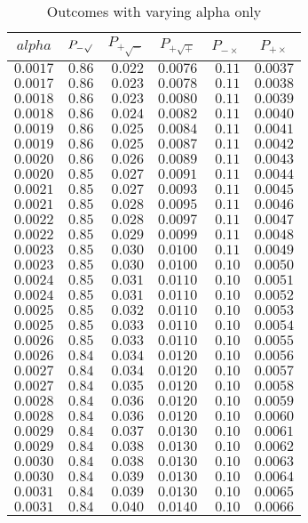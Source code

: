 %
\begin{table}[\hbtp]
 \small
 \begin{center}
 \begin{tabular}{rrrrrr}\hline\hline
\multicolumn{1}{c}{$alpha$}&\multicolumn{1}{c}{$P_{-\surd}$}&\multicolumn{1}{c}{$P_{+\surd - }$}&\multicolumn{1}{c}{$P_{+\surd +}$}&\multicolumn{1}{c}{$P_{-\times}$}&\multicolumn{1}{c}{$P_{+\times}$}\tabularnewline
\hline
$0.0017$&$0.86$&$0.022$&$0.0076$&$0.11$&$0.0037$\tabularnewline
$0.0017$&$0.86$&$0.023$&$0.0078$&$0.11$&$0.0038$\tabularnewline
$0.0018$&$0.86$&$0.023$&$0.0080$&$0.11$&$0.0039$\tabularnewline
$0.0018$&$0.86$&$0.024$&$0.0082$&$0.11$&$0.0040$\tabularnewline
$0.0019$&$0.86$&$0.025$&$0.0084$&$0.11$&$0.0041$\tabularnewline
$0.0019$&$0.86$&$0.025$&$0.0087$&$0.11$&$0.0042$\tabularnewline
$0.0020$&$0.86$&$0.026$&$0.0089$&$0.11$&$0.0043$\tabularnewline
$0.0020$&$0.85$&$0.027$&$0.0091$&$0.11$&$0.0044$\tabularnewline
$0.0021$&$0.85$&$0.027$&$0.0093$&$0.11$&$0.0045$\tabularnewline
$0.0021$&$0.85$&$0.028$&$0.0095$&$0.11$&$0.0046$\tabularnewline
$0.0022$&$0.85$&$0.028$&$0.0097$&$0.11$&$0.0047$\tabularnewline
$0.0022$&$0.85$&$0.029$&$0.0099$&$0.11$&$0.0048$\tabularnewline
$0.0023$&$0.85$&$0.030$&$0.0100$&$0.11$&$0.0049$\tabularnewline
$0.0023$&$0.85$&$0.030$&$0.0100$&$0.10$&$0.0050$\tabularnewline
$0.0024$&$0.85$&$0.031$&$0.0110$&$0.10$&$0.0051$\tabularnewline
$0.0024$&$0.85$&$0.031$&$0.0110$&$0.10$&$0.0052$\tabularnewline
$0.0025$&$0.85$&$0.032$&$0.0110$&$0.10$&$0.0053$\tabularnewline
$0.0025$&$0.85$&$0.033$&$0.0110$&$0.10$&$0.0054$\tabularnewline
$0.0026$&$0.85$&$0.033$&$0.0110$&$0.10$&$0.0055$\tabularnewline
$0.0026$&$0.84$&$0.034$&$0.0120$&$0.10$&$0.0056$\tabularnewline
$0.0027$&$0.84$&$0.034$&$0.0120$&$0.10$&$0.0057$\tabularnewline
$0.0027$&$0.84$&$0.035$&$0.0120$&$0.10$&$0.0058$\tabularnewline
$0.0028$&$0.84$&$0.036$&$0.0120$&$0.10$&$0.0059$\tabularnewline
$0.0028$&$0.84$&$0.036$&$0.0120$&$0.10$&$0.0060$\tabularnewline
$0.0029$&$0.84$&$0.037$&$0.0130$&$0.10$&$0.0061$\tabularnewline
$0.0029$&$0.84$&$0.038$&$0.0130$&$0.10$&$0.0062$\tabularnewline
$0.0030$&$0.84$&$0.038$&$0.0130$&$0.10$&$0.0063$\tabularnewline
$0.0030$&$0.84$&$0.039$&$0.0130$&$0.10$&$0.0064$\tabularnewline
$0.0031$&$0.84$&$0.039$&$0.0130$&$0.10$&$0.0065$\tabularnewline
$0.0031$&$0.84$&$0.040$&$0.0140$&$0.10$&$0.0066$\tabularnewline
\hline
\end{tabular}

\end{center}

\caption{Outcomes with varying alpha only\label{tbl:alpha_varying_only}} 

\end{table}

